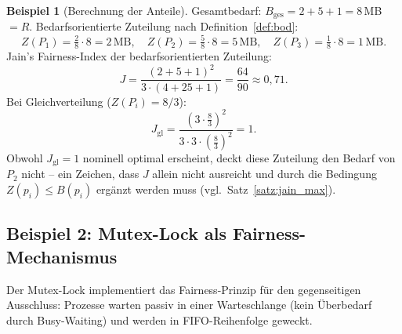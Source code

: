 ﻿\documentclass[a4paper,12pt]{article}
\theoremstyle{definition}
\newtheorem{beispiel}{Beispiel}
\begin{document}
\begin{beispiel}[Berechnung der Anteile]
Gesamtbedarf: $B_{\mathrm{ges}} = 2 + 5 + 1 = 8$\,MB $= R$.
Bedarfsorientierte Zuteilung nach Definition~\ref{def:bod}:
\[
  Z(P_1) = \tfrac{2}{8} \cdot 8 = 2\,\text{MB},\quad
  Z(P_2) = \tfrac{5}{8} \cdot 8 = 5\,\text{MB},\quad
  Z(P_3) = \tfrac{1}{8} \cdot 8 = 1\,\text{MB}.
\]
Jain's Fairness-Index der bedarfsorientierten Zuteilung:
\[
  J = \frac{(2+5+1)^2}{3 \cdot (4+25+1)} = \frac{64}{90} \approx 0{,}71.
\]
Bei Gleichverteilung ($Z(P_i) = 8/3$):
\[
  J_{\mathrm{gl}} = \frac{(3 \cdot \frac{8}{3})^2}{3 \cdot 3 \cdot (\frac{8}{3})^2}
  = 1.
\]
Obwohl $J_{\mathrm{gl}} = 1$ nominell optimal erscheint, deckt diese
Zuteilung den Bedarf von $P_2$ nicht -- ein Zeichen, dass $J$ allein
nicht ausreicht und durch die Bedingung $Z(p_i) \leq B(p_i)$
ergänzt werden muss (vgl.\ Satz~\ref{satz:jain_max}).
\end{beispiel}

\subsection{Beispiel 2: Mutex-Lock als Fairness-Mechanismus}

Der Mutex-Lock implementiert das Fairness-Prinzip für den gegenseitigen
Ausschluss: Prozesse warten passiv in einer Warteschlange (kein Überbedarf
durch Busy-Waiting) und werden in FIFO-Reihenfolge geweckt.
\end{document}
